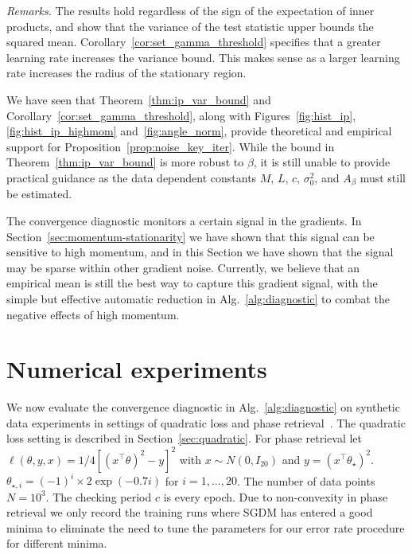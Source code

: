 \documentclass[conference]{IEEEtran}
\begin{document}
\emph{Remarks.}
The results hold regardless of the sign of the expectation of inner products, and show that the variance of the test statistic upper bounds the squared mean. 
Corollary~\ref{cor:set_gamma_threshold} specifies that a greater learning rate increases the variance bound.
This makes sense as a larger learning rate increases the radius of the stationary region.



We have seen that Theorem~\ref{thm:ip_var_bound} and Corollary~\ref{cor:set_gamma_threshold}, along with Figures~\ref{fig:hist_ip}, \ref{fig:hist_ip_highmom} and~\ref{fig:angle_norm}, provide theoretical and empirical support for Proposition~\ref{prop:noise_key_iter}. While the bound in Theorem~\ref{thm:ip_var_bound} is more robust to $\beta$, it is still unable to provide practical guidance as  the data dependent constants $M$, $L$, $c$, $\sigma_0^2$, and $A_\beta$ must still be estimated.

The convergence diagnostic monitors a certain signal in the gradients.
In Section~\ref{sec:momentum-stationarity} we have shown that this signal can be sensitive to high momentum, and in this Section we have shown that the signal may be sparse within other gradient noise.
Currently, we believe that an empirical mean is still the best way to capture this gradient signal, with the simple but effective automatic reduction in Alg.~\ref{alg:diagnostic} to combat the negative effects of high momentum. 


\section{Numerical experiments}\label{sec:synth-data-experiments}
We now evaluate the convergence diagnostic in Alg.~\ref{alg:diagnostic} on synthetic data experiments in settings of quadratic loss and phase retrieval~\cite{Article:Chen_MP19}.
The quadratic loss setting is described in Section~\ref{sec:quadratic}. For phase retrieval let $\ell ( \theta, y, x ) = 1/4 [ ( x^\top \theta )^2 - y ]^2$ with $x \sim N ( 0, I_{20} )$ and $y = ( x^\top \theta_\star )^2$.
$\theta_{\star,i} = (-1)^i \times 2 \exp( -0.7 i )$ for $i = 1, \dots, 20$.
The number of data points $N = 10^3$.
The checking period $c$ is every epoch.
Due to non-convexity in phase retrieval we only record the training runs where SGDM has entered a good minima to eliminate the need to tune  the parameters for our error rate procedure for different minima.
\end{document}

